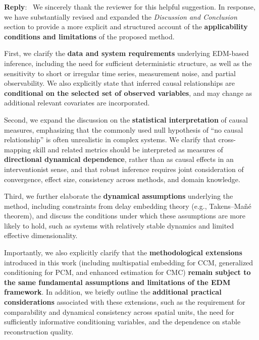 \documentclass[11pt]{article}
\newcounter{reviewer}
\newenvironment{reply}
   {\medskip \noindent \color{blue} \begin{sf}\textbf{Reply}:\  }
   {\medskip \par \end{sf}}
\begin{document}
\begin{reply}
We sincerely thank the reviewer for this helpful suggestion. In response, we have substantially revised and expanded the \textit{Discussion and Conclusion} section to provide a more explicit and structured account of the \textbf{applicability conditions and limitations} of the proposed method.

First, we clarify the \textbf{data and system requirements} underlying EDM-based inference, including the need for sufficient deterministic structure, as well as the sensitivity to short or irregular time series, measurement noise, and partial observability. We also explicitly state that inferred causal relationships are \textbf{conditional on the selected set of observed variables}, and may change as additional relevant covariates are incorporated.

Second, we expand the discussion on the \textbf{statistical interpretation} of causal measures, emphasizing that the commonly used null hypothesis of ``no causal relationship'' is often unrealistic in complex systems. We clarify that cross-mapping skill and related metrics should be interpreted as measures of \textbf{directional dynamical dependence}, rather than as causal effects in an interventionist sense, and that robust inference requires joint consideration of convergence, effect size, consistency across methods, and domain knowledge.

Third, we further elaborate the \textbf{dynamical assumptions} underlying the method, including constraints from delay embedding theory (e.g., Takens--Ma{\~n}{\'e} theorem), and discuss the conditions under which these assumptions are more likely to hold, such as systems with relatively stable dynamics and limited effective dimensionality.

Importantly, we also explicitly clarify that the \textbf{methodological extensions} introduced in this work (including multispatial embedding for CCM, generalized conditioning for PCM, and enhanced estimation for CMC) \textbf{remain subject to the same fundamental assumptions and limitations of the EDM framework}. In addition, we briefly outline the \textbf{additional practical considerations} associated with these extensions, such as the requirement for comparability and dynamical consistency across spatial units, the need for sufficiently informative conditioning variables, and the dependence on stable reconstruction quality.

\vspace{1em}


\end{reply}
\end{document}
